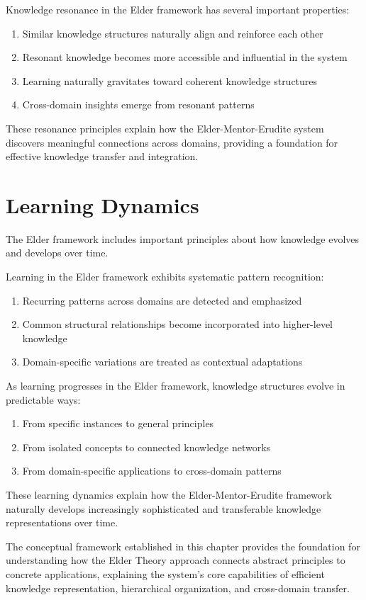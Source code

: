 \begin{theorem}
Knowledge resonance in the Elder framework has several important properties:
\begin{enumerate}
    \item Similar knowledge structures naturally align and reinforce each other
    \item Resonant knowledge becomes more accessible and influential in the system
    \item Learning naturally gravitates toward coherent knowledge structures
    \item Cross-domain insights emerge from resonant patterns
\end{enumerate}
\end{theorem}

These resonance principles explain how the Elder-Mentor-Erudite system discovers meaningful connections across domains, providing a foundation for effective knowledge transfer and integration.

\section{Learning Dynamics}

The Elder framework includes important principles about how knowledge evolves and develops over time.

\begin{theorem}
Learning in the Elder framework exhibits systematic pattern recognition:
\begin{enumerate}
    \item Recurring patterns across domains are detected and emphasized
    \item Common structural relationships become incorporated into higher-level knowledge
    \item Domain-specific variations are treated as contextual adaptations
\end{enumerate}
\end{theorem}

\begin{theorem}
As learning progresses in the Elder framework, knowledge structures evolve in predictable ways:
\begin{enumerate}
    \item From specific instances to general principles
    \item From isolated concepts to connected knowledge networks
    \item From domain-specific applications to cross-domain patterns
\end{enumerate}
\end{theorem}

These learning dynamics explain how the Elder-Mentor-Erudite framework naturally develops increasingly sophisticated and transferable knowledge representations over time.

The conceptual framework established in this chapter provides the foundation for understanding how the Elder Theory approach connects abstract principles to concrete applications, explaining the system's core capabilities of efficient knowledge representation, hierarchical organization, and cross-domain transfer.